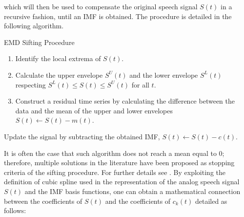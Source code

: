 which will then be used to compensate the original speech signal $S(t)$ in a recursive fashion, until an IMF is obtained.  The procedure is detailed in the following algorithm.

\begin{algorithm}[H]
\small

\label{sifting_algorithm}
\caption{EMD Sifting Procedure}

\BlankLine
\addtolength\linewidth{-12ex}

 
{
{
\begin{enumerate}[label=(\roman*)]

\item Identify the local extrema of $S(t)$.  %
\item Calculate the upper envelope $S^U(t)$ and the lower envelope $S^L(t)$ respecting $S^L(t) \leq S(t) \leq S^U(t)$ for all $t$. 
%
\item Construct a residual time series by calculating the difference between the data and the mean of the upper and lower envelopes $S(t)\leftarrow S(t) - m(t)$.

\end{enumerate}
}



Update the signal by subtracting the obtained IMF, $S(t) \leftarrow S(t)-c(t)$. 
\BlankLine
\BlankLine

}
\end{algorithm}

\normalsize

It is often the case that such algorithm does not reach a mean equal to 0; therefore, multiple solutions in the literature have been proposed as stopping criteria of the sifting procedure. For further details see \cite{Machine}. By exploiting the definition of cubic spline used in the representation of the analog speech signal $S(t)$ and the IMF basis functions, one can obtain a mathematical connection between the coefficients of $S(t)$ and the coefficients of $c_k(t)$ detailed as follows: 

%
%
%

